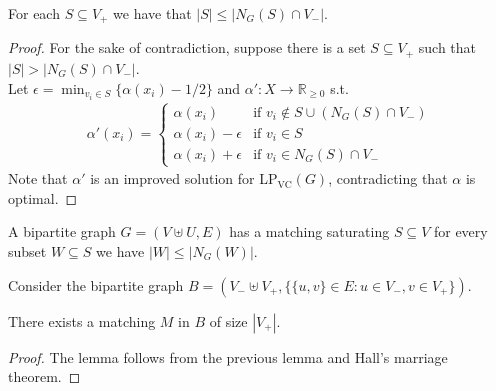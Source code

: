 \begin{frame}

 \begin{lemma}
  For each $S\subseteq V_+$ we have that $|S| \le |N_G(S) \cap V_-|$. %
 \end{lemma}
 \begin{proof}
  For the sake of contradiction, suppose there is a set $S\subseteq V_+$ such that $|S| > |N_G(S) \cap V_-|$.\\
  Let $\epsilon = \min_{v_i\in S}\{\alpha(x_i)-1/2\}$ and $\alpha':X\rightarrow \mathbb{R}_{\ge 0}$ s.t.
  \begin{align*}
   \alpha'(x_i) = \begin{cases}
                   \alpha(x_i) &\text{if } v_i \notin S\cup (N_G(S) \cap V_-)\\
                   \alpha(x_i)-\epsilon &\text{if } v_i \in S\\
                   \alpha(x_i)+\epsilon &\text{if } v_i \in N_G(S)\cap V_-
                  \end{cases}
  \end{align*}
  Note that $\alpha'$ is an improved solution for LP$_{\text{VC}}(G)$, contradicting that $\alpha$ is optimal.
 \end{proof}
\end{frame}


\begin{frame}

 \begin{theorem}
  A bipartite graph $G=(V \uplus U,E)$ has a matching saturating $S\subseteq V$ \slides{\begin{align*}\Leftrightarrow\end{align*}} for every subset $W\subseteq S$ we have $|W| \le |N_G(W)|$. 
 \end{theorem}
 
 \pause
 \medskip
 \noindent
 Consider the bipartite %
 graph $B=(V_-\uplus V_+, \{\{u,v\} \in E : u\in V_-, v\in V_+\})$.
 
 \begin{lemma}
  There exists a matching $M$ in $B$ of size $|V_+|$.
 \end{lemma}
 \begin{proof}
  The lemma follows from the previous lemma and Hall's marriage theorem.
 \end{proof}

\end{frame}


